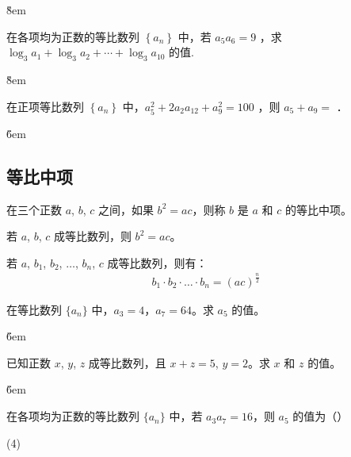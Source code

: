 \v{8em}

\begin{example}
    在各项均为正数的等比数列 $\left\{a_n\right\}$ 中，若 $a_5 a_6=9$ ，求 $\log _3 a_1+\log _3 a_2+\cdots+\log _3 a_{10}$ 的值.
\end{example}

\v{8em}

\begin{example}
    在正项等比数列 $\left\{a_n\right\}$ 中，$a_5^2+2 a_2 a_{12}+a_9^2=100$ ，则 $a_5+a_9=$ \underline{\qquad}．
\end{example}

\v{6em}

\subsection{等比中项}

\begin{definition}
    在三个正数 $a$, $b$, $c$ 之间，如果 $b^2 = ac$，则称 $b$ 是 $a$ 和 $c$ 的等比中项。
\end{definition}

\begin{theorem}
    若 $a$, $b$, $c$ 成等比数列，则 $b^2 = ac$。

    若 $a$, $b_1$, $b_2$, $\ldots$, $b_n$, $c$ 成等比数列，则有：
    \begin{align}
        b_1 \cdot b_2 \cdot \ldots \cdot b_n = (ac)^{\frac{n}{2}}
    \end{align}
\end{theorem}

\begin{example}
    在等比数列 $\{a_n\}$ 中，$a_3 = 4$，$a_7 = 64$。求 $a_5$ 的值。
\end{example}

\v{6em}

\begin{example}
    已知正数 $x$, $y$, $z$ 成等比数列，且 $x + z = 5$, $y = 2$。求 $x$ 和 $z$ 的值。
\end{example}

\v{6em}

\begin{example}
    在各项均为正数的等比数列 $\{a_n\}$ 中，若 $a_3 a_7 = 16$，则 $a_5$ 的值为（\qquad）
    \begin{tasks}(4)
    \end{tasks}
\end{example}


